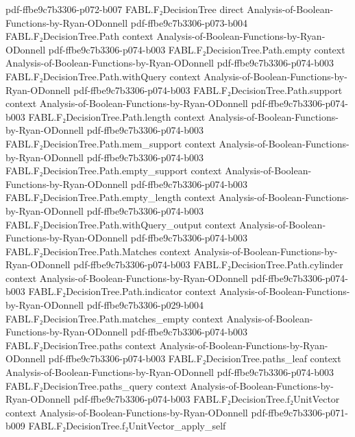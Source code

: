 \begin{theorem}
  {pdf-ffbe9c7b3306-p072-b007}
\proofstep
  {FABL.F₂DecisionTree}
  {direct}
  {Analysis-of-Boolean-Functions-by-Ryan-ODonnell}
  {pdf-ffbe9c7b3306-p073-b004}
\proofstep
  {FABL.F₂DecisionTree.Path}
  {context}
  {Analysis-of-Boolean-Functions-by-Ryan-ODonnell}
  {pdf-ffbe9c7b3306-p074-b003}
\proofstep
  {FABL.F₂DecisionTree.Path.empty}
  {context}
  {Analysis-of-Boolean-Functions-by-Ryan-ODonnell}
  {pdf-ffbe9c7b3306-p074-b003}
\proofstep
  {FABL.F₂DecisionTree.Path.withQuery}
  {context}
  {Analysis-of-Boolean-Functions-by-Ryan-ODonnell}
  {pdf-ffbe9c7b3306-p074-b003}
\proofstep
  {FABL.F₂DecisionTree.Path.support}
  {context}
  {Analysis-of-Boolean-Functions-by-Ryan-ODonnell}
  {pdf-ffbe9c7b3306-p074-b003}
\proofstep
  {FABL.F₂DecisionTree.Path.length}
  {context}
  {Analysis-of-Boolean-Functions-by-Ryan-ODonnell}
  {pdf-ffbe9c7b3306-p074-b003}
\proofstep
  {FABL.F₂DecisionTree.Path.mem_support}
  {context}
  {Analysis-of-Boolean-Functions-by-Ryan-ODonnell}
  {pdf-ffbe9c7b3306-p074-b003}
\proofstep
  {FABL.F₂DecisionTree.Path.empty_support}
  {context}
  {Analysis-of-Boolean-Functions-by-Ryan-ODonnell}
  {pdf-ffbe9c7b3306-p074-b003}
\proofstep
  {FABL.F₂DecisionTree.Path.empty_length}
  {context}
  {Analysis-of-Boolean-Functions-by-Ryan-ODonnell}
  {pdf-ffbe9c7b3306-p074-b003}
\proofstep
  {FABL.F₂DecisionTree.Path.withQuery_output}
  {context}
  {Analysis-of-Boolean-Functions-by-Ryan-ODonnell}
  {pdf-ffbe9c7b3306-p074-b003}
\proofstep
  {FABL.F₂DecisionTree.Path.Matches}
  {context}
  {Analysis-of-Boolean-Functions-by-Ryan-ODonnell}
  {pdf-ffbe9c7b3306-p074-b003}
\proofstep
  {FABL.F₂DecisionTree.Path.cylinder}
  {context}
  {Analysis-of-Boolean-Functions-by-Ryan-ODonnell}
  {pdf-ffbe9c7b3306-p074-b003}
\proofstep
  {FABL.F₂DecisionTree.Path.indicator}
  {context}
  {Analysis-of-Boolean-Functions-by-Ryan-ODonnell}
  {pdf-ffbe9c7b3306-p029-b004}
\proofstep
  {FABL.F₂DecisionTree.Path.matches_empty}
  {context}
  {Analysis-of-Boolean-Functions-by-Ryan-ODonnell}
  {pdf-ffbe9c7b3306-p074-b003}
\proofstep
  {FABL.F₂DecisionTree.paths}
  {context}
  {Analysis-of-Boolean-Functions-by-Ryan-ODonnell}
  {pdf-ffbe9c7b3306-p074-b003}
\proofstep
  {FABL.F₂DecisionTree.paths_leaf}
  {context}
  {Analysis-of-Boolean-Functions-by-Ryan-ODonnell}
  {pdf-ffbe9c7b3306-p074-b003}
\proofstep
  {FABL.F₂DecisionTree.paths_query}
  {context}
  {Analysis-of-Boolean-Functions-by-Ryan-ODonnell}
  {pdf-ffbe9c7b3306-p074-b003}
\proofstep
  {FABL.F₂DecisionTree.f₂UnitVector}
  {context}
  {Analysis-of-Boolean-Functions-by-Ryan-ODonnell}
  {pdf-ffbe9c7b3306-p071-b009}
\proofstep
  {FABL.F₂DecisionTree.f₂UnitVector_apply_self}

\end{theorem}
